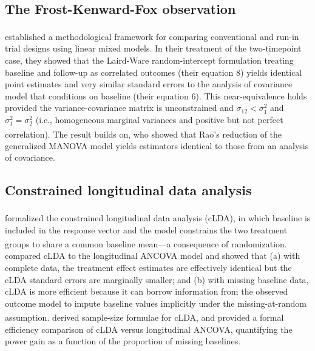 \documentclass[
  11pt,
]{article}
\begin{document}
\subsection{The Frost-Kenward-Fox observation}\label{the-frost-kenward-fox-observation}

\textsuperscript{} established a methodological
framework for comparing conventional and run-in trial
designs using linear mixed models. In their treatment
of the two-timepoint case, they showed that the
Laird-Ware random-intercept formulation treating
baseline and follow-up as correlated outcomes (their
equation 8) yields identical point estimates and very
similar standard errors to the analysis of covariance
model that conditions on baseline (their equation 6).
This near-equivalence holds provided the
variance-covariance matrix is unconstrained and
\(\sigma_{12} < \sigma_1^2\) and
\(\sigma_1^2 = \sigma_2^2\) (i.e., homogeneous marginal
variances and positive but not perfect correlation).
The result builds on\textsuperscript{}, who showed that
Rao's reduction of the\textsuperscript{}
generalized MANOVA model yields estimators identical
to those from an analysis of covariance.

\subsection{Constrained longitudinal data analysis}\label{constrained-longitudinal-data-analysis}

\textsuperscript{} formalized the constrained
longitudinal data analysis (cLDA), in which baseline
is included in the response vector and the model
constrains the two treatment groups to share a common
baseline mean---a consequence of randomization.\textsuperscript{} compared cLDA to the longitudinal
ANCOVA model and showed that (a) with complete data,
the treatment effect estimates are effectively
identical but the cLDA standard errors are marginally
smaller; and (b) with missing baseline data, cLDA is
more efficient because it can borrow information from
the observed outcome model to impute baseline values
implicitly under the missing-at-random assumption.\textsuperscript{} derived sample-size formulae for cLDA,
and\textsuperscript{} provided a formal efficiency
comparison of cLDA versus longitudinal ANCOVA,
quantifying the power gain as a function of the
proportion of missing baselines.
\end{document}
